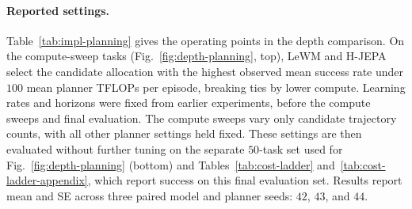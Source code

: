\paragraph{Reported settings.} Table~\ref{tab:impl-planning} gives the operating
points in the depth comparison. On the compute-sweep tasks
(Fig.~\ref{fig:depth-planning}, top), LeWM and H-JEPA select the candidate
allocation with the highest observed mean success rate under $100$ mean planner
TFLOPs per episode, breaking ties by lower compute. Learning rates and horizons
were fixed from earlier experiments, before the compute sweeps and final
evaluation. The compute sweeps vary only candidate trajectory counts, with all
other planner settings held fixed. These settings are then evaluated without further tuning on the
separate $50$-task set used for Fig.~\ref{fig:depth-planning} (bottom) and
Tables~\ref{tab:cost-ladder} and~\ref{tab:cost-ladder-appendix}, which report
success on this final evaluation set. Results report mean and SE across
three paired model and planner seeds: $42$, $43$, and $44$.

